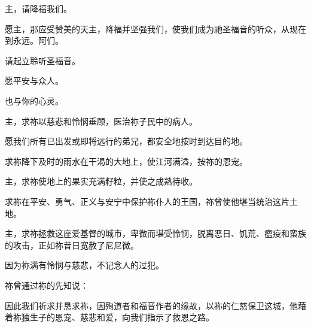 \par

主，请降福我们。\par

\par

愿主，那应受赞美的天主，降福并坚强我们，使我们成为祂圣福音的听众，从现在到永远。阿们。\par

\par

请起立聆听圣福音。\par

\par

愿平安与众人。\par

\par

也与你的心灵。\par

\par

主，求祢以慈悲和怜悯垂顾，医治祢子民中的病人。\par

愿我们所有已出发或即将远行的弟兄，都安全地按时到达目的地。\par

求祢降下及时的雨水在干渴的大地上，使江河满溢，按祢的恩宠。\par

主，求祢使地上的果实充满籽粒，并使之成熟待收。\par

求祢在平安、勇气、正义与安宁中保护祢仆人的王国，祢曾使他堪当统治这片土地。\par

主，求祢拯救这座爱基督的城市，卑微而堪受怜悯，脱离恶日、饥荒、瘟疫和蛮族的攻击，正如祢昔日宽赦了尼尼微。\par

因为祢满有怜悯与慈悲，不记念人的过犯。\par

祢曾通过祢的先知说：\par

因此我们祈求并恳求祢，因殉道者和福音作者的缘故，以祢的仁慈保卫这城，他藉着祢独生子的恩宠、慈悲和爱，向我们指示了救恩之路。\par

